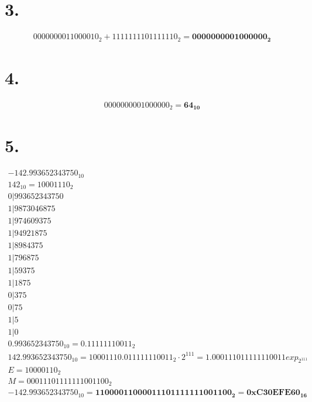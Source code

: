 \documentclass{article}
\begin{document}
\begin{normalsize}
	\section*{3.}
	\begin{Large}
		\begin{gather}
			0000000011000010_2+1111111101111110_2=\boldsymbol{0000000001000000_2}\nonumber
		\end{gather}
	\end{Large}

	\section*{4.}
	\begin{Large}
		\begin{gather}
			0000000001000000_2 = \boldsymbol{64_{10}}\nonumber
		\end{gather}
	\end{Large}

	\section*{5.}
	\begin{Large}
		\begin{gather}
			-142.993652343750_{10} \nonumber\\
			142_{10} = 10001110_2\nonumber\\
			0|993652343750\nonumber\\
			1|9873046875\nonumber\\
			1|974609375\nonumber\\
			1|94921875\nonumber\\
			1|8984375\nonumber\\
			1|796875\nonumber\\
			1|59375\nonumber\\
			1|1875\nonumber\\
			0|375\nonumber\\
			0|75\nonumber\\
			1|5\nonumber\\
			1|0\nonumber\\
			0.993652343750_{10} = 0.11111110011_2\nonumber\\
			142.993652343750_{10} = 10001110.011111110011_2\cdot2^{111} = 1.000111011111110011exp_{2^{111}}\nonumber\\
			E = 10000110_2\nonumber\\
			M = 00011101111111001100_2\nonumber\\
			-142.993652343750_{10} = \boldsymbol{11000011000011101111111001100_2} = \boldsymbol{0xC30EFE60_{16}}\nonumber
		\end{gather}
	\end{Large}


\end{normalsize}
\end{document}
